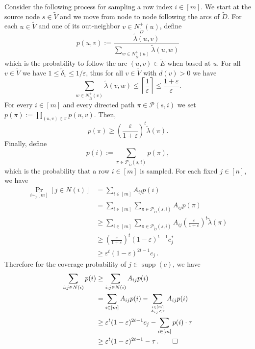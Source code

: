 \documentclass[11pt]{article}
\DeclareMathOperator{\supp}{supp}
\newcommand{\proba}{\Pr}
\newcommand{\eps}{\varepsilon}
\newcommand{\numrounds}{t}
\newcommand{\rhs}{\delta}
\newcommand{\threshold}{\tau}
\theoremstyle{remark}
\begin{document}
    Consider the following process for sampling a row index $i \in [m]$. We start at the source node $s \in \tilde{V}$ and we move from node to node following the arcs of $\tilde{D}$. 
    For each $u \in \tilde{V}$ and one of its out-neighbor $v \in N_{\tilde{D}}^+(u)$, define
    $$
    p(u,v) := \frac{\tilde{\lambda}(u,v)}{\sum_{w \in N_{\tilde{D}}^+(u)} \tilde{\lambda}(u,w)}
    $$
    which is the probability to follow the arc $(u,v)\in \tilde{E}$ when based at $u$. 
    For all $v \in \tilde{V}$ we have $1 \le \tilde{\rhs}_v \le 1/\eps$, thus for all $v \in \tilde{V}$ with $d(v) > 0$ we have
    $$
    \sum_{w \in N_{\tilde{D}}^+(v)} \tilde{\lambda}(v,w) \le \left\lceil\frac{1}{\eps}\right\rceil \le \frac{1+\eps}{\eps}.
    $$ 
	For every $i \in [m]$ and every directed path $\pi \in \mathcal{P}(s,i)$ we set $p(\pi):= \prod_{(u,v)\in \pi}p(u,v)$. Then, 
    \begin{equation*}
        p(\pi) \ge \left(\frac{\eps}{1+\eps}\right)^{\numrounds} \tilde{\lambda}(\pi).
    \end{equation*} 
    Finally, define 
    \begin{equation}\label{eq:sampling-prob-rank-t}
        p(i) := \sum_{\pi \in \mathcal{P}_{\tilde{D}}(s,i)} p(\pi),
    \end{equation}
    which is the probability that a row $i \in [m]$ is sampled. For each fixed $j \in [n]$, we have
    \begin{align*}
	    \proba_{i \sim_p [m]} [j \in N(i)] &=
    \sum_{i \in [m]} A_{ij} p(i) \\
	    &=\sum_{i \in [m]} \sum_{\pi \in \mathcal{P}_{\tilde{D}}(s,i)} A_{ij} p(\pi)\\
    &\ge \sum_{i \in [m]} \sum_{\pi \in \mathcal{P}_{\tilde{D}}(s,i)} A_{ij} \left(\frac{\eps}{1+\eps}\right)^{\numrounds} \tilde{\lambda}(\pi)\\
    &\ge \left(\frac{\eps}{1+\eps}\right)^{\numrounds} (1-\eps)^{\numrounds-1} c^*_j\\
    &\ge \eps^\numrounds (1-\eps)^{2\numrounds-1} c_j\,.
    \end{align*}
    Therefore for the coverage probability of $j\in \supp(c)$, we have
    \begin{align*}
    \sum_{i: j \in N(i)} p(i) &\ge \sum_{i: j \in N(i)} A_{ij} p(i) \\
    &= \sum_{i \in [m]} A_{ij} p(i) - \sum_{i \in [m] \atop A_{ij} < \threshold} A_{ij} p(i)\\
    &\ge \eps^\numrounds (1-\eps)^{2\numrounds-1} c_j - \sum_{i \in [m]} p(i) \cdot \tau \\
    &\ge \eps^\numrounds (1-\eps)^{2\numrounds-1} - \tau \,. \qedhere
    \end{align*}
\end{document}
